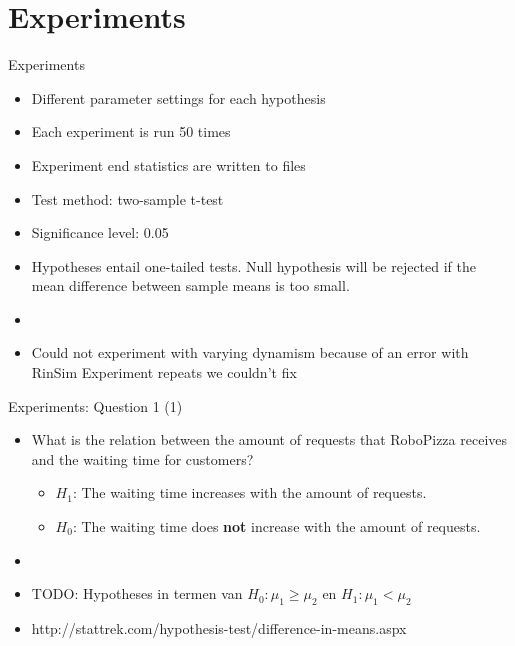 \section{Experiments}

\begin{frame}{Experiments}
    \begin{itemize}
        \item Different parameter settings for each hypothesis
        \item Each experiment is run 50 times
        \item Experiment end statistics are written to files
        \item Test method: two-sample t-test %
        \item Significance level: 0.05
        \item Hypotheses entail one-tailed tests. Null hypothesis will be rejected if the mean difference between sample means is too small.

        \item[]
        \item Could not experiment with varying dynamism because of an error with RinSim Experiment repeats we couldn't fix
    \end{itemize}
\end{frame}


\begin{frame}{Experiments: Question 1 (1)}
    \begin{itemize}
        \item What is the relation between the amount of requests that RoboPizza receives and the waiting time for customers?
        \begin{itemize}
                \item $H_1$: The waiting time increases with the amount of requests.
                \item $H_0$: The waiting time does \textbf{not} increase with the amount of requests.
        \end{itemize}

        \item[]
        \item TODO: Hypotheses in termen van $H_0: \mu_1 \geq \mu_2$ en $H_1: \mu_1 < \mu_2$
        \item http://stattrek.com/hypothesis-test/difference-in-means.aspx
    \end{itemize}
\end{frame}


